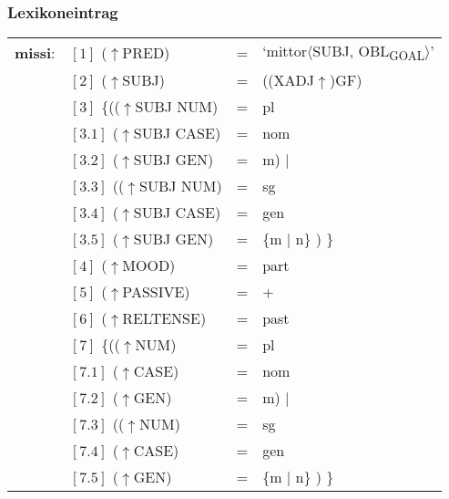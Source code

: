 \documentclass[12pt,a4paper]{article}
\begin{document}
\subsubsection{Lexikoneintrag}
\begin{singlespace}
\begin{tabular}{ l  l  l  l  } 
\textbf{missi}: & $[1]$ \:  ($\uparrow$PRED) & = & `mittor$\langle$SUBJ, OBL\textsubscript{GOAL}$\rangle$'\\
$\qquad$ & $[2]$ \:  ($\uparrow$SUBJ) & = & ((XADJ$\uparrow$)GF) \\
$\qquad$ & $[3]$ \:  \{(($\uparrow$SUBJ NUM) & = & pl \\ 
$\qquad$ & $[3.1]$ \:  ($\uparrow$SUBJ CASE) & = & nom \\
$\qquad$ & $[3.2]$ \:  ($\uparrow$SUBJ GEN) & = & m) $\mid$\\
$\qquad$ & $[3.3]$ \:  (($\uparrow$SUBJ NUM) & = & sg \\ 
$\qquad$ & $[3.4]$ \: ($\uparrow$SUBJ CASE) & = & gen \\
$\qquad$ & $[3.5]$ \:  ($\uparrow$SUBJ GEN) & = & \{m $\mid$ n\} ) \} \\
$\qquad$ & $[4]$ \:  ($\uparrow$MOOD) & = & part \\
$\qquad$ & $[5]$ \:  ($\uparrow$PASSIVE) & = & + \\
$\qquad$ & $[6]$ \: ($\uparrow$RELTENSE) & = & past \\
$\qquad$ & $[7]$ \:  \{(($\uparrow$NUM) & = & pl \\ 
$\qquad$ & $[7.1]$ \:  ($\uparrow$CASE) & = & nom \\
$\qquad$ & $[7.2]$ \:  ($\uparrow$GEN) & = & m) $\mid$\\
$\qquad$ & $[7.3]$ \:  (($\uparrow$NUM) & = & sg \\ 
$\qquad$ & $[7.4]$ \: ($\uparrow$CASE) & = & gen \\
$\qquad$ & $[7.5]$ \:  ($\uparrow$GEN) & = & \{m $\mid$ n\} ) \} \\
\end{tabular}
\end{singlespace}
\end{document}
